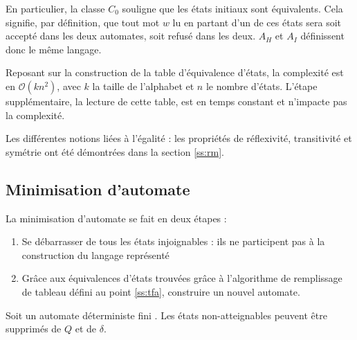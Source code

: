 	 En particulier, la classe $C_0$ souligne que les états initiaux sont équivalents. Cela signifie, par définition, que tout mot $w$ lu en partant d'un de ces états sera soit accepté dans les deux automates, soit refusé dans les deux. $A_H$ et $A_I$ définissent donc le même langage.
	 
	 \begin{complexity}
	 	Reposant sur la construction de la table d'équivalence d'états, la complexité est en $\mathcal{O}(kn^2)$, avec $k$ la taille de l'alphabet et $n$ le nombre d'états. L'étape supplémentaire, la lecture de cette table, est en temps constant et n'impacte pas la complexité.
	 \end{complexity}
	 
	 
	 Les différentes notions liées à l'égalité : les propriétés de réflexivité, transitivité et symétrie ont été démontrées dans la section \ref{ss:rm}.
	 
	 
	 
	 \subsection{Minimisation d'automate}\label{ss:miniauto}
	 
	 La minimisation d'automate se fait en deux étapes :
	 \begin{enumerate}
	 	\item Se débarrasser de tous les états injoignables : ils ne participent pas à la construction du langage représenté
	 	\item Grâce aux équivalences d'états trouvées grâce à l'algorithme de remplissage de tableau défini au point \ref{ss:tfa}, construire un nouvel automate. 
	 \end{enumerate}
	 
	 Soit un automate déterministe fini \automaton. Les états non-atteignables peuvent être supprimés de $Q$ et de $\delta$.
	 
